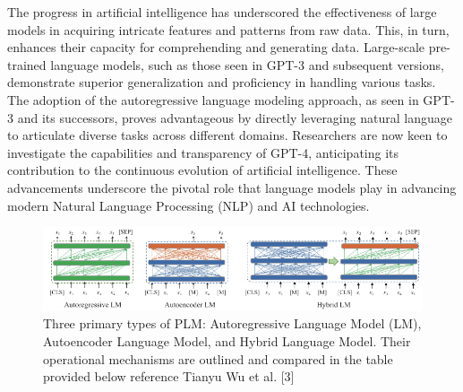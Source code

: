 \documentclass[fleqn,10pt]{thescipub} %
\begin{document}
The progress in artificial intelligence has underscored the effectiveness of large models in acquiring intricate features and patterns from raw data. This, in turn, enhances their capacity for comprehending and generating data. Large-scale pre-trained language models, such as those seen in GPT-3 and subsequent versions, demonstrate superior generalization and proficiency in handling various tasks. The adoption of the autoregressive language modeling approach, as seen in GPT-3 and its successors, proves advantageous by directly leveraging natural language to articulate diverse tasks across different domains. Researchers are now keen to investigate the capabilities and transparency of GPT-4, anticipating its contribution to the continuous evolution of artificial intelligence. These advancements underscore the pivotal role that language models play in advancing modern Natural Language Processing (NLP) and AI technologies.

\begin{figure}
    \centering
    \includegraphics[width=\textwidth]{LMTYPES}
    \caption{Three primary types of PLM: Autoregressive Language Model (LM), Autoencoder Language Model, and Hybrid Language Model. Their operational mechanisms are outlined and compared in the table provided below reference Tianyu Wu et al. [3]}
    \label{fig:your_image_label}
\end{figure}
\end{document}
